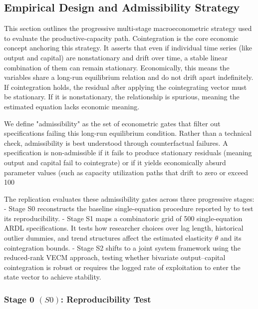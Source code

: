 \documentclass[11pt]{article}
\begin{document}
\subsection{Empirical Design and Admissibility Strategy}
\label{subsec:empirical_design}

This section outlines the progressive multi-stage macroeconometric strategy used to evaluate the productive-capacity path. Cointegration is the core economic concept anchoring this strategy. It asserts that even if individual time series (like output and capital) are nonstationary and drift over time, a stable linear combination of them can remain stationary. Economically, this means the variables share a long-run equilibrium relation and do not drift apart indefinitely. If cointegration holds, the residual after applying the cointegrating vector must be stationary. If it is nonstationary, the relationship is spurious, meaning the estimated equation lacks economic meaning.

We define "admissibility" as the set of econometric gates that filter out specifications failing this long-run equilibrium condition. Rather than a technical check, admissibility is best understood through counterfactual failures. A specification is non-admissible if it fails to produce stationary residuals (meaning output and capital fail to cointegrate) or if it yields economically absurd parameter values (such as capacity utilization paths that drift to zero or exceed 100%

The replication evaluates these admissibility gates across three progressive stages:
- Stage S0 reconstructs the baseline single-equation procedure reported by \citet{Shaikh2016} to test its reproducibility.
- Stage S1 maps a combinatoric grid of 500 single-equation ARDL specifications. It tests how researcher choices over lag length, historical outlier dummies, and trend structures affect the estimated elasticity $\theta$ and its cointegration bounds.
- Stage S2 shifts to a joint system framework using the \citet{Johansen1991} reduced-rank VECM approach, testing whether bivariate output--capital cointegration is robust or requires the logged rate of exploitation to enter the state vector to achieve stability.

\subsubsection{Stage 0 \texorpdfstring{$(S0)$}{}: Reproducibility Test}
\label{subsec:S0_reproducibility}
\end{document}
